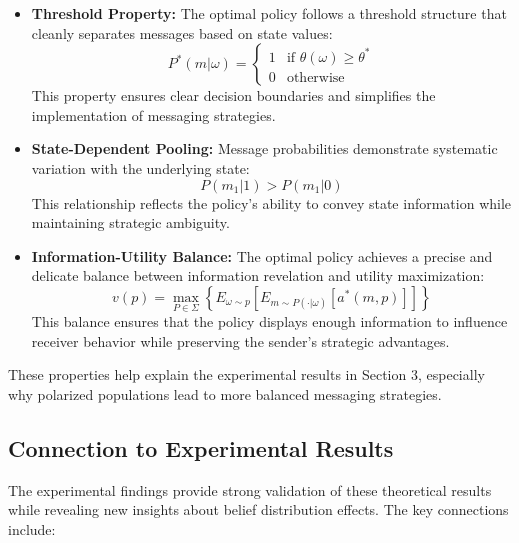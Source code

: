 \documentclass[12pt]{article}
\theoremstyle{plain}
\theoremstyle{definition}
\theoremstyle{remark}
\begin{document}
\begin{itemize}
    \item \textbf{Threshold Property:} The optimal policy follows a threshold structure that cleanly separates messages based on state values:
    \[P^*(m|\omega) = \begin{cases}
        1 & \text{if }\theta(\omega) \geq \theta^*\\
        0 & \text{otherwise}
    \end{cases}\]
    This property ensures clear decision boundaries and simplifies the implementation of messaging strategies.

    \item \textbf{State-Dependent Pooling:} Message probabilities demonstrate systematic variation with the underlying state:
    \[P(m_1|1) > P(m_1|0)\]
    This relationship reflects the policy's ability to convey state information while maintaining strategic ambiguity.

    \item \textbf{Information-Utility Balance:} The optimal policy achieves a precise and delicate balance between information revelation and utility maximization:
    \[v(p) = \max_{P\in\Sigma} \left\{E_{\omega\sim p}\left[E_{m\sim P(\cdot|\omega)}[a^*(m,p)]\right]\right\}\]
    This balance ensures that the policy displays enough information to influence receiver behavior while preserving the sender's strategic advantages.
\end{itemize}

These properties help explain the experimental results in Section 3, especially why polarized populations lead to more balanced messaging strategies.

\subsection{Connection to Experimental Results}
The experimental findings provide strong validation of these theoretical results while revealing new insights about belief distribution effects. The key connections include:
\end{document}
